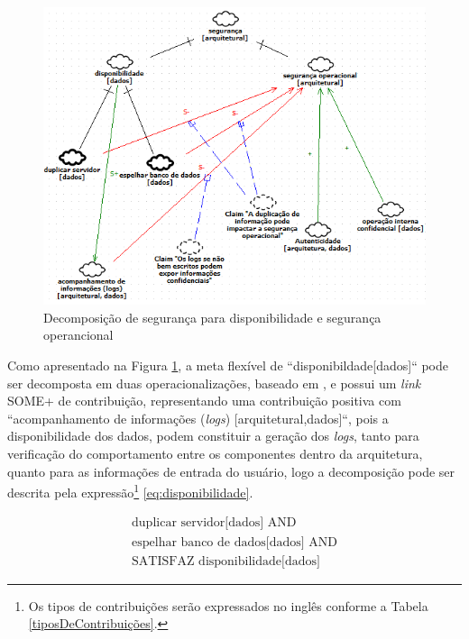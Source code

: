 \begin{figure}[h!]
	\centering
	\includegraphics[keepaspectratio=true,scale=0.8]{figuras/SIG-SO-e-Disponibilidade.PNG}
	\caption{Decomposição de segurança para disponibilidade e segurança operancional}
	\label{DecomposicaoDisponibilidade}
\end{figure}

Como apresentado na Figura \ref{DecomposicaoDisponibilidade}, a meta flexível de ``disponibildade[dados]`` pode ser decomposta em duas operacionalizações, baseado em \cite{affleck2012supporting}, e possui um \textit{link} SOME+ de contribuição, representando uma contribuição positiva com ``acompanhamento de informações (\textit{logs}) [arquitetural,dados]``, pois a disponibilidade dos dados, podem constituir a geração dos \textit{logs}, tanto para verificação do comportamento entre os componentes dentro da arquitetura, quanto para as informações de entrada do usuário, logo a decomposição pode ser descrita pela expressão\footnote[1]{Os tipos de contribuições serão expressados no inglês conforme a Tabela \ref{tiposDeContribuições}.} \ref{eq:disponibilidade}.

\pagebreak

\begin{eqnarray}
\label{eq:disponibilidade}
\textrm{duplicar servidor[dados] AND}  \nonumber\\
\textrm{espelhar banco de dados[dados] AND} \nonumber \\
\textrm{SATISFAZ disponibilidade[dados]} 
\end{eqnarray}

